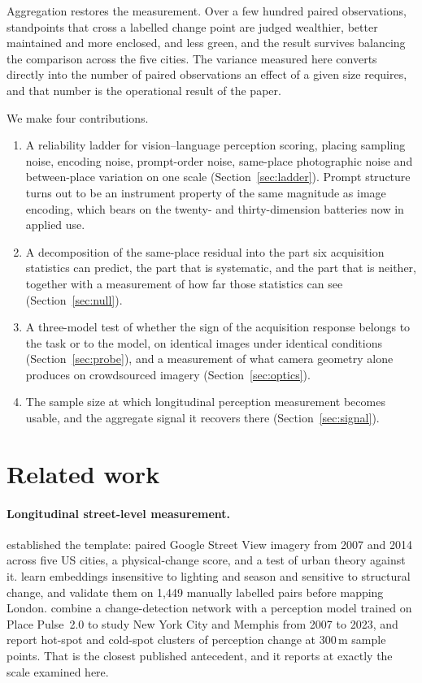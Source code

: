 Aggregation restores the measurement. Over a few hundred paired observations,
standpoints that cross a labelled change point are judged wealthier, better
maintained and more enclosed, and less green, and the result survives balancing
the comparison across the five cities. The variance
measured here converts directly into the number of paired observations an effect
of a given size requires, and that number is the operational result of the
paper.

We make four contributions.

\begin{enumerate}
\item A reliability ladder for vision--language perception scoring, placing
      sampling noise, encoding noise, prompt-order noise, same-place
      photographic noise and between-place variation on one scale
      (Section~\ref{sec:ladder}). Prompt structure turns out to be an instrument
      property of the same magnitude as image encoding, which bears on the
      twenty- and thirty-dimension batteries now in applied use.
\item A decomposition of the same-place residual into the part six acquisition
      statistics can predict, the part that is systematic, and the part that is
      neither, together with a measurement of how far those statistics can see
      (Section~\ref{sec:null}).
\item A three-model test of whether the sign of the acquisition response belongs
      to the task or to the model, on identical images under identical
      conditions (Section~\ref{sec:probe}), and a measurement of what camera
      geometry alone produces on crowdsourced imagery
      (Section~\ref{sec:optics}).
\item The sample size at which longitudinal perception measurement becomes
      usable, and the aggregate signal it recovers there
      (Section~\ref{sec:signal}).
\end{enumerate}

\section{Related work}

\paragraph{Longitudinal street-level measurement.}
\citet{naik2017computer} established the template: paired Google Street View
imagery from 2007 and 2014 across five US cities, a physical-change score, and a
test of urban theory against it. \citet{stalder2024self} learn embeddings
insensitive to lighting and season and sensitive to structural change, and
validate them on 1{,}449 manually labelled pairs before mapping London.
\citet{liu2025physical} combine a change-detection network with a perception
model trained on Place Pulse~2.0 to study New York City and Memphis from 2007 to
2023, and report hot-spot and cold-spot clusters of perception change at 300\,m
sample points. That is the closest published antecedent, and it reports at
exactly the scale examined here.


